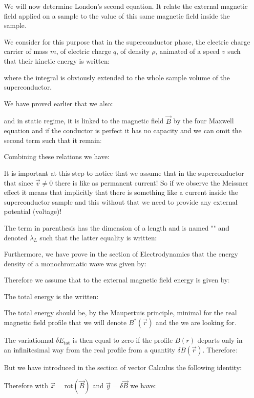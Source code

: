 	We will now determine London's second equation. It relate the external magnetic field applied on a sample to the value of this same magnetic field inside the sample.
	
	We consider for this purpose that in the superconductor phase, the electric charge carrier of mass $m$, of electric charge $q$, of density $\rho$, animated of a speed $v$ such that their kinetic energy is written:
	
	where the integral is obviously extended to the whole sample volume of the superconductor. 
	
	We have proved earlier that we also:
	
	and in static regime, it is linked to the magnetic field $\vec{B}$ by the four Maxwell equation and if the conductor is perfect it has no capacity and we can omit the second term such that it remain:
	
	Combining these relations we have:
	
	It is important at this step to notice that we assume that in the superconductor that since $\vec{v}\neq 0$ there is like as permanent current! So if we observe the Meissner effect it means that implicitly that there is something like a current inside the superconductor sample and this without that we need to provide any external potential (voltage)!
	
	The term in parenthesis has the dimension of a length and is named "" and denoted $\lambda_L$ such that the latter equality is written:
	
	Furthermore, we have prove in the section of Electrodynamics that the energy density of a monochromatic wave was given by:
	
	Therefore we assume that to the external magnetic field energy is given by:
	
	The total energy is the written:
	
	The total energy should be, by the Maupertuis principle, minimal for the real magnetic field profile that we will denote $B^{*}(\vec{r})$ and the we are looking for.
	
	The variationnal $\delta E_\text{tot}$ is then equal to zero if the profile $B(r)$ departs only in an infinitesimal way from the real profile from a quantity $\delta B(\vec{r})$. Therefore:
	
	But we have introduced in the section of vector Calculus the following identity:
	
	Therefore with $\vec{x}=\text{rot}(\vec{B})$ and $\vec{y}=\delta\vec{B}$ we have:
	
